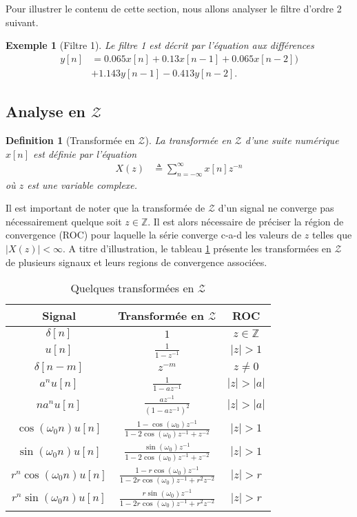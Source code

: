\documentclass[11pt,a4paper]{IEEEtran}
\newtheorem*{exemple}{Exemple}
\newtheorem{definition}{Definition}
\begin{document}
Pour illustrer le contenu de cette section, nous allons analyser le filtre d'ordre 2 suivant.
\begin{exemple}[Filtre 1] Le filtre 1 est décrit par l'équation aux différences 
\begin{align*}
y[n]&=0.065x[n]+0.13 x[n-1]+0.065x[n-2])\\
&+1.143y[n-1]-0.413y[n-2].
\end{align*}
\end{exemple}

\subsection{Analyse en $\mathcal{Z}$}

\begin{definition}[Transformée en $\mathcal{Z}$]
La transformée en $\mathcal{Z}$ d'une suite numérique $x[n]$ est définie par l'équation
\begin{align}
X(z)&\triangleq \sum_{n=-\infty}^{\infty}x[n]z^{-n}
\end{align}
où $z$ est une variable complexe.
\end{definition}
Il est important de noter que la transformée de $\mathcal{Z}$ d'un signal ne converge pas nécessairement quelque soit $z \in \mathbb{Z}$. Il est alors nécessaire de préciser la région de convergence (ROC) pour laquelle la série converge c-a-d les valeurs de $z$ telles que $|X(z)|<\infty$. A titre d'illustration, le tableau \ref{app_tabZ} présente les transformées en $\mathcal{Z}$ de plusieurs signaux et leurs regions de convergence associées.

\begin{table}[!t]
\begin{tabular}{ccc}
Signal  & Transformée en $\mathcal{Z}$ & ROC\\
\hline
$\delta[n]$ & $1$ & $z \in \mathbb{Z}$\\
$u[n]$& $\frac{1}{1-z^{-1}}$ & $|z| > 1$\\ 
$\delta[n-m]$& $z^{-m}$ & $z \ne 0$ \\ 
$a^n u[n]$& $\frac{1}{1-az^{-1}}$ & $|z| > |a|$ \\ 
$na^n u[n]$& $\frac{az^{-1}}{(1-az^{-1})^2}$ & $|z| > |a|$ \\ 
$\cos (\omega_0 n)u[n]$& $\frac{1-\cos(\omega_0)z^{-1}}{1-2\cos(\omega_0)z^{-1}+z^{-2}}$ & $|z| > 1$ \\ 
$\sin (\omega_0 n)u[n]$& $\frac{\sin(\omega_0)z^{-1}}{1-2\cos(\omega_0)z^{-1}+z^{-2}}$ & $|z| > 1$ \\ 
$r^n\cos (\omega_0 n)u[n]$& $\frac{1-r\cos(\omega_0)z^{-1}}{1-2r\cos(\omega_0)z^{-1}+r^2z^{-2}}$ & $|z| > r$ \\ 
$r^n\sin (\omega_0 n)u[n]$& $\frac{r\sin(\omega_0)z^{-1}}{1-2r\cos(\omega_0)z^{-1}+r^2z^{-2}}$ & $|z| > r$ \\ 
\hline
\end{tabular}
\caption{Quelques transformées en $\mathcal{Z}$}\label{app_tabZ}
\end{table}
\end{document}
